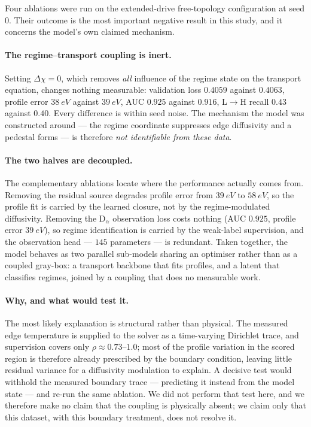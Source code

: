 Four ablations were run on the extended-drive free-topology configuration
at seed $0$. Their outcome is the most important negative result in this
study, and it concerns the model's own claimed mechanism.

\paragraph{The regime--transport coupling is inert.} Setting
$\Delta\chi = 0$, which removes \emph{all} influence of the regime state
on the transport equation, changes nothing measurable: validation loss
$0.4059$ against $0.4063$, profile error $\SI{38}{eV}$ against
$\SI{39}{eV}$, AUC $0.925$ against $0.916$, L$\to$H recall $0.43$ against
$0.40$. Every difference is within seed noise. The mechanism the model was
constructed around --- the regime coordinate suppresses edge diffusivity and
a pedestal forms --- is therefore \emph{not identifiable from these data}.

\paragraph{The two halves are decoupled.} The complementary ablations
locate where the performance actually comes from. Removing the residual
source degrades profile error from $\SI{39}{eV}$ to $\SI{58}{eV}$, so the
profile fit is carried by the learned closure, not by the regime-modulated
diffusivity. Removing the D$_\alpha$ observation loss costs nothing
(AUC $0.925$, profile error $\SI{39}{eV}$), so regime identification is
carried by the weak-label supervision, and the observation head --- $145$
parameters --- is redundant. Taken together, the model behaves as two
parallel sub-models sharing an optimiser rather than as a coupled
gray-box: a transport backbone that fits profiles, and a latent that
classifies regimes, joined by a coupling that does no measurable work.

\paragraph{Why, and what would test it.} The most likely explanation is
structural rather than physical. The measured edge temperature is supplied
to the solver as a time-varying Dirichlet trace, and supervision covers only
$\rho \approx 0.73$--$1.0$; most of the profile variation in the scored
region is therefore already prescribed by the boundary condition, leaving
little residual variance for a diffusivity modulation to explain. A decisive
test would withhold the measured boundary trace --- predicting it instead
from the model state --- and re-run the same ablation. We did not perform
that test here, and we therefore make no claim that the coupling is
physically absent; we claim only that this dataset, with this boundary
treatment, does not resolve it.

